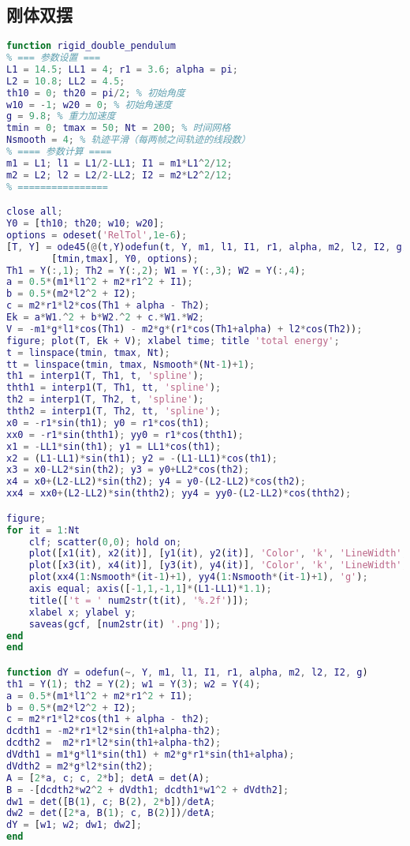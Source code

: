 \subsection{刚体双摆}
\begin{lstlisting}[language=matlab, caption=rigid\_double\_pendulum.m]
% 刚体双摆
function rigid_double_pendulum
% === 参数设置 ===
L1 = 14.5; LL1 = 4; r1 = 3.6; alpha = pi;
L2 = 10.8; LL2 = 4.5;
th10 = 0; th20 = pi/2; % 初始角度
w10 = -1; w20 = 0; % 初始角速度
g = 9.8; % 重力加速度
tmin = 0; tmax = 50; Nt = 200; % 时间网格
Nsmooth = 4; % 轨迹平滑（每两帧之间轨迹的线段数）
% ==== 参数计算 ====
m1 = L1; l1 = L1/2-LL1; I1 = m1*L1^2/12;
m2 = L2; l2 = L2/2-LL2; I2 = m2*L2^2/12;
% ================

close all;
Y0 = [th10; th20; w10; w20];
options = odeset('RelTol',1e-6);
[T, Y] = ode45(@(t,Y)odefun(t, Y, m1, l1, I1, r1, alpha, m2, l2, I2, g), ...
        [tmin,tmax], Y0, options);
Th1 = Y(:,1); Th2 = Y(:,2); W1 = Y(:,3); W2 = Y(:,4);
a = 0.5*(m1*l1^2 + m2*r1^2 + I1);
b = 0.5*(m2*l2^2 + I2);
c = m2*r1*l2*cos(Th1 + alpha - Th2);
Ek = a*W1.^2 + b*W2.^2 + c.*W1.*W2;
V = -m1*g*l1*cos(Th1) - m2*g*(r1*cos(Th1+alpha) + l2*cos(Th2));
figure; plot(T, Ek + V); xlabel time; title 'total energy';
t = linspace(tmin, tmax, Nt);
tt = linspace(tmin, tmax, Nsmooth*(Nt-1)+1);
th1 = interp1(T, Th1, t, 'spline');
thth1 = interp1(T, Th1, tt, 'spline');
th2 = interp1(T, Th2, t, 'spline');
thth2 = interp1(T, Th2, tt, 'spline');
x0 = -r1*sin(th1); y0 = r1*cos(th1);
xx0 = -r1*sin(thth1); yy0 = r1*cos(thth1);
x1 = -LL1*sin(th1); y1 = LL1*cos(th1);
x2 = (L1-LL1)*sin(th1); y2 = -(L1-LL1)*cos(th1);
x3 = x0-LL2*sin(th2); y3 = y0+LL2*cos(th2);
x4 = x0+(L2-LL2)*sin(th2); y4 = y0-(L2-LL2)*cos(th2);
xx4 = xx0+(L2-LL2)*sin(thth2); yy4 = yy0-(L2-LL2)*cos(thth2);

figure;
for it = 1:Nt
    clf; scatter(0,0); hold on;
    plot([x1(it), x2(it)], [y1(it), y2(it)], 'Color', 'k', 'LineWidth', 2);
    plot([x3(it), x4(it)], [y3(it), y4(it)], 'Color', 'k', 'LineWidth', 2);
    plot(xx4(1:Nsmooth*(it-1)+1), yy4(1:Nsmooth*(it-1)+1), 'g');
    axis equal; axis([-1,1,-1,1]*(L1-LL1)*1.1);
    title(['t = ' num2str(t(it), '%.2f')]);
    xlabel x; ylabel y;
    saveas(gcf, [num2str(it) '.png']);
end
end

function dY = odefun(~, Y, m1, l1, I1, r1, alpha, m2, l2, I2, g)
th1 = Y(1); th2 = Y(2); w1 = Y(3); w2 = Y(4);
a = 0.5*(m1*l1^2 + m2*r1^2 + I1);
b = 0.5*(m2*l2^2 + I2);
c = m2*r1*l2*cos(th1 + alpha - th2);
dcdth1 = -m2*r1*l2*sin(th1+alpha-th2);
dcdth2 =  m2*r1*l2*sin(th1+alpha-th2);
dVdth1 = m1*g*l1*sin(th1) + m2*g*r1*sin(th1+alpha);
dVdth2 = m2*g*l2*sin(th2);
A = [2*a, c; c, 2*b]; detA = det(A);
B = -[dcdth2*w2^2 + dVdth1; dcdth1*w1^2 + dVdth2];
dw1 = det([B(1), c; B(2), 2*b])/detA;
dw2 = det([2*a, B(1); c, B(2)])/detA;
dY = [w1; w2; dw1; dw2];
end
\end{lstlisting}
